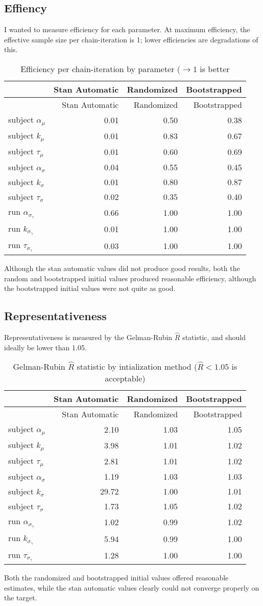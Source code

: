 \documentclass[]{article}
\begin{document}
\subsection{Effiency}\label{effiency}

I wanted to measure efficiency for each parameter. At maximum
efficiency, the effective sample size per chain-iteration is 1; lower
efficiencies are degradations of this.

\begin{longtable}[]{@{}lrrr@{}}
\caption{Efficiency per chain-iteration by parameter (\(\rightarrow 1\)
is better}\tabularnewline
\toprule
& Stan Automatic & Randomized & Bootstrapped\tabularnewline
\midrule
\endfirsthead
\toprule
& Stan Automatic & Randomized & Bootstrapped\tabularnewline
\midrule
\endhead
subject \(\alpha_{\mu}\) & 0.01 & 0.50 & 0.38\tabularnewline
subject \(k_{\mu}\) & 0.01 & 0.83 & 0.67\tabularnewline
subject \(\tau_{\mu}\) & 0.01 & 0.60 & 0.69\tabularnewline
subject \(\alpha_{\sigma}\) & 0.04 & 0.55 & 0.45\tabularnewline
subject \(k_{\sigma}\) & 0.01 & 0.80 & 0.87\tabularnewline
subject \(\tau_{\sigma}\) & 0.02 & 0.35 & 0.40\tabularnewline
run \(\alpha_{\sigma_{\gamma}}\) & 0.66 & 1.00 & 1.00\tabularnewline
run \(k_{\sigma_{\gamma}}\) & 0.01 & 1.00 & 1.00\tabularnewline
run \(\tau_{\sigma_{\gamma}}\) & 0.03 & 1.00 & 1.00\tabularnewline
\bottomrule
\end{longtable}

Although the stan automatic values did not produce good results, both
the random and bootstrapped initial values produced reasonable
efficiency, although the bootstrapped initial values were not quite as
good.

\subsection{Representativeness}\label{representativeness}

Representativeness is measured by the Gelman-Rubin \(\hat{R}\)
statistic, and should ideally be lower than 1.05.

\begin{longtable}[]{@{}lrrr@{}}
\caption{Gelman-Rubin \(\hat{R}\) statistic by intialization method
(\(\hat{R}<1.05\) is acceptable)}\tabularnewline
\toprule
& Stan Automatic & Randomized & Bootstrapped\tabularnewline
\midrule
\endfirsthead
\toprule
& Stan Automatic & Randomized & Bootstrapped\tabularnewline
\midrule
\endhead
subject \(\alpha_{\mu}\) & 2.10 & 1.03 & 1.05\tabularnewline
subject \(k_{\mu}\) & 3.98 & 1.01 & 1.02\tabularnewline
subject \(\tau_{\mu}\) & 2.81 & 1.01 & 1.02\tabularnewline
subject \(\alpha_{\sigma}\) & 1.19 & 1.03 & 1.03\tabularnewline
subject \(k_{\sigma}\) & 29.72 & 1.00 & 1.01\tabularnewline
subject \(\tau_{\sigma}\) & 1.73 & 1.05 & 1.02\tabularnewline
run \(\alpha_{\sigma_{\gamma}}\) & 1.02 & 0.99 & 1.02\tabularnewline
run \(k_{\sigma_{\gamma}}\) & 5.94 & 0.99 & 1.00\tabularnewline
run \(\tau_{\sigma_{\gamma}}\) & 1.28 & 1.00 & 1.00\tabularnewline
\bottomrule
\end{longtable}

Both the randomized and bootstrapped initial values offered reasonable
estimates, while the stan automatic values clearly could not converge
properly on the target.
\end{document}
